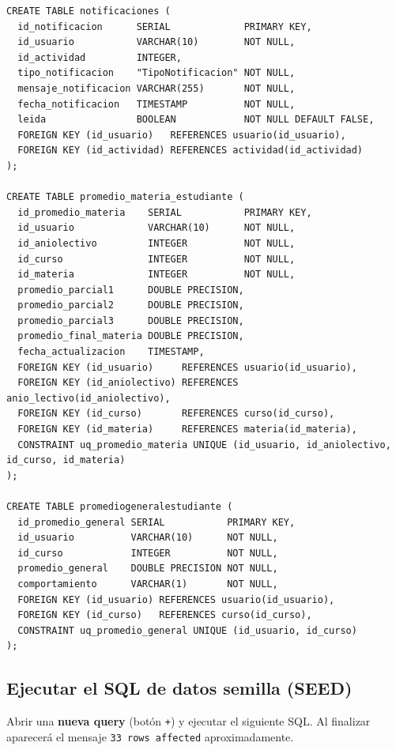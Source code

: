 \documentclass[12pt, a4paper]{article}
\newcommand{\cmd}[1]{\texttt{#1}}
\begin{document}
\begin{lstlisting}[style=sql, caption={DDL completo --- estructura de tablas y ENUMs.}]
CREATE TABLE notificaciones (
  id_notificacion      SERIAL             PRIMARY KEY,
  id_usuario           VARCHAR(10)        NOT NULL,
  id_actividad         INTEGER,
  tipo_notificacion    "TipoNotificacion" NOT NULL,
  mensaje_notificacion VARCHAR(255)       NOT NULL,
  fecha_notificacion   TIMESTAMP          NOT NULL,
  leida                BOOLEAN            NOT NULL DEFAULT FALSE,
  FOREIGN KEY (id_usuario)   REFERENCES usuario(id_usuario),
  FOREIGN KEY (id_actividad) REFERENCES actividad(id_actividad)
);

CREATE TABLE promedio_materia_estudiante (
  id_promedio_materia    SERIAL           PRIMARY KEY,
  id_usuario             VARCHAR(10)      NOT NULL,
  id_aniolectivo         INTEGER          NOT NULL,
  id_curso               INTEGER          NOT NULL,
  id_materia             INTEGER          NOT NULL,
  promedio_parcial1      DOUBLE PRECISION,
  promedio_parcial2      DOUBLE PRECISION,
  promedio_parcial3      DOUBLE PRECISION,
  promedio_final_materia DOUBLE PRECISION,
  fecha_actualizacion    TIMESTAMP,
  FOREIGN KEY (id_usuario)     REFERENCES usuario(id_usuario),
  FOREIGN KEY (id_aniolectivo) REFERENCES anio_lectivo(id_aniolectivo),
  FOREIGN KEY (id_curso)       REFERENCES curso(id_curso),
  FOREIGN KEY (id_materia)     REFERENCES materia(id_materia),
  CONSTRAINT uq_promedio_materia UNIQUE (id_usuario, id_aniolectivo, id_curso, id_materia)
);

CREATE TABLE promediogeneralestudiante (
  id_promedio_general SERIAL           PRIMARY KEY,
  id_usuario          VARCHAR(10)      NOT NULL,
  id_curso            INTEGER          NOT NULL,
  promedio_general    DOUBLE PRECISION NOT NULL,
  comportamiento      VARCHAR(1)       NOT NULL,
  FOREIGN KEY (id_usuario) REFERENCES usuario(id_usuario),
  FOREIGN KEY (id_curso)   REFERENCES curso(id_curso),
  CONSTRAINT uq_promedio_general UNIQUE (id_usuario, id_curso)
);
\end{lstlisting}

\subsection{Ejecutar el SQL de datos semilla (SEED)}

Abrir una \textbf{nueva query} (botón \texttt{+}) y ejecutar el siguiente SQL.
Al finalizar aparecerá el mensaje \cmd{33 rows affected} aproximadamente.
\end{document}
